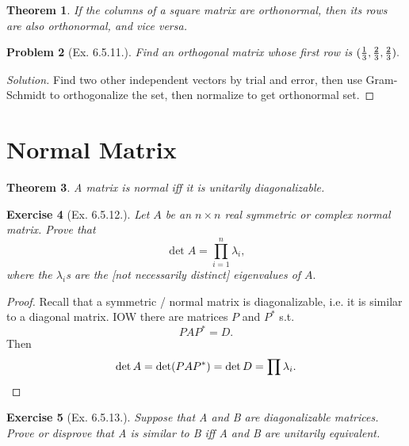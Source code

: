 \documentclass[12pt]{article}
\theoremstyle{plain}
\newtheorem{theorem}{Theorem}
\newtheorem{problem}[theorem]{Problem}
\newtheorem{exercise}[theorem]{Exercise}
\theoremstyle{definition}
\theoremstyle{remark}
\newenvironment{solution}{\begin{proof}[Solution]}{\end{proof}}
\renewcommand\frac[2]{\genfrac{}{}{0.6pt}{}{#1}{#2}}
\newcommand{\0}{\varnothing}
\newcommand{\<}{\langle}
\renewcommand{\>}{\rangle}
\begin{document}
\begin{theorem}
  If the columns of a square matrix are orthonormal, then its rows are also orthonormal, and vice versa.
\end{theorem}

\begin{problem}[Ex. 6.5.11.]
  Find an orthogonal matrix whose first row is \( (\frac{1}{3}, \frac{2}{3}, \frac{2}{3}). \)
\end{problem}

\begin{solution}
  Find two other independent vectors by trial and error, then use Gram-Schmidt to orthogonalize the set, then normalize to get orthonormal set.
\end{solution}

\section*{Normal Matrix}

\begin{theorem}
  A matrix is normal iff it is unitarily diagonalizable.
\end{theorem}

\begin{exercise}[Ex. 6.5.12.]
  Let \( A \) be an \( n \times n \) real symmetric or complex normal matrix. Prove that
  \[
  \det A = \prod_{i=1}^n \lambda_i,
  \]
  where the \( \lambda_i \)s are the [not necessarily distinct] eigenvalues of \( A. \)
\end{exercise}

\begin{proof}
  Recall that a symmetric / normal matrix is diagonalizable, i.e. it is similar to a diagonal matrix. IOW there are matrices \( P \) and \( P^* \) s.t.
  \[
  P A P^* = D.
  \]
  Then
  \[
  \det A = \det (P A P^*) = \det D = \prod \lambda_i. \qedhere
  \]
\end{proof}

\begin{exercise}[Ex. 6.5.13.]
  Suppose that A and B are diagonalizable matrices. Prove or disprove that A is similar to B iff A and B are unitarily equivalent.
\end{exercise}
\end{document}
